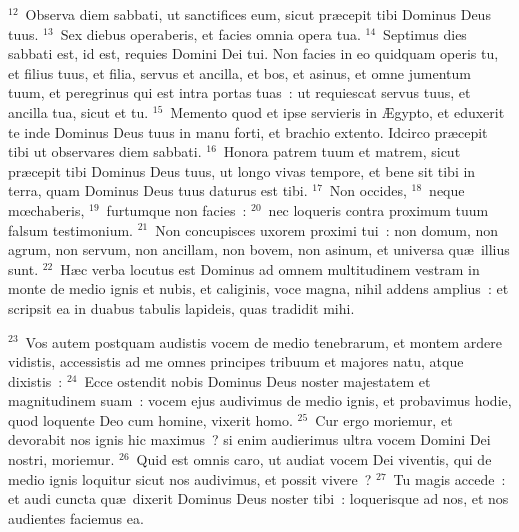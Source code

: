${}^{12}$~Observa diem sabbati, ut sanctifices eum, sicut pr\ae cepit tibi Dominus Deus tuus.
${}^{13}$~Sex diebus operaberis, et facies omnia opera tua.
${}^{14}$~Septimus dies sabbati est, id est, requies Domini Dei tui. Non facies in eo quidquam operis tu, et filius tuus, et filia, servus et ancilla, et bos, et asinus, et omne jumentum tuum, et peregrinus qui est intra portas tuas~: ut requiescat servus tuus, et ancilla tua, sicut et tu.
${}^{15}$~Memento quod et ipse servieris in \AE gypto, et eduxerit te inde Dominus Deus tuus in manu forti, et brachio extento. Idcirco pr\ae cepit tibi ut observares diem sabbati.
${}^{16}$~Honora patrem tuum et matrem, sicut pr\ae cepit tibi Dominus Deus tuus, ut longo vivas tempore, et bene sit tibi in terra, quam Dominus Deus tuus daturus est tibi.
${}^{17}$~Non occides,
${}^{18}$~neque mœchaberis,
${}^{19}$~furtumque non facies~:
${}^{20}$~nec loqueris contra proximum tuum falsum testimonium.
${}^{21}$~Non concupisces uxorem proximi tui~: non domum, non agrum, non servum, non ancillam, non bovem, non asinum, et universa qu\ae\ illius sunt.
${}^{22}$~H\ae c verba locutus est Dominus ad omnem multitudinem vestram in monte de medio ignis et nubis, et caliginis, voce magna, nihil addens amplius~: et scripsit ea in duabus tabulis lapideis, quas tradidit mihi.


${}^{23}$~Vos autem postquam audistis vocem de medio tenebrarum, et montem ardere vidistis, accessistis ad me omnes principes tribuum et majores natu, atque dixistis~:
${}^{24}$~Ecce ostendit nobis Dominus Deus noster majestatem et magnitudinem suam~: vocem ejus audivimus de medio ignis, et probavimus hodie, quod loquente Deo cum homine, vixerit homo.
${}^{25}$~Cur ergo moriemur, et devorabit nos ignis hic maximus~? si enim audierimus ultra vocem Domini Dei nostri, moriemur.
${}^{26}$~Quid est omnis caro, ut audiat vocem Dei viventis, qui de medio ignis loquitur sicut nos audivimus, et possit vivere~?
${}^{27}$~Tu magis accede~: et audi cuncta qu\ae\ dixerit Dominus Deus noster tibi~: loquerisque ad nos, et nos audientes faciemus ea.


